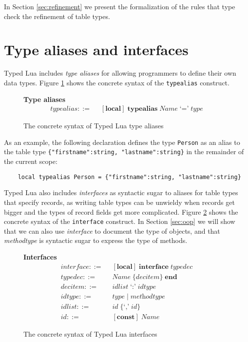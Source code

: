 In Section \ref{sec:refinement} we present the formalization of the
rules that type check the refinement of table types.

\section{Type aliases and interfaces}
\label{sec:alias}

Typed Lua includes \emph{type aliases} for allowing programmers to
define their own data types.
Figure \ref{fig:aliases} shows the concrete syntax of the
\texttt{typealias} construct.

\begin{figure}[!ht]
\textbf{Type aliases}\\
\dstart
\begin{align*}
\textit{typealias} ::= & \;\; [\textbf{local}] \; \textbf{typealias} \; \textit{Name} \; \texttt{`='} \; \textit{type}
\end{align*}
\dend
\caption{The concrete syntax of Typed Lua type aliases}
\label{fig:aliases}
\end{figure}

As an example, the following declaration defines the type \texttt{Person}
as an alias to the table type \texttt{\{"firstname":string, "lastname":string\}}
in the remainder of the current scope:
\begin{verbatim}
    local typealias Person = {"firstname":string, "lastname":string}
\end{verbatim}

Typed Lua also includes \emph{interfaces} as syntactic sugar to aliases
for table types that specify records, as writing table types can be unwieldy
when records get bigger and the types of record fields get more complicated.
Figure \ref{fig:interfaces} shows the concrete syntax of the
\texttt{interface} construct.
In Section \ref{sec:oop} we will show that we can also use \emph{interface} to
document the type of objects, and that \emph{methodtype} is syntactic
sugar to express the type of methods.

\begin{figure}[!ht]
\textbf{Interfaces}\\
\dstart
\begin{align*}
\textit{interface} ::= & \;\; [\textbf{local}] \; \textbf{interface} \; \textit{typedec}\\
\textit{typedec} ::= & \;\; \textit{Name} \; \{\textit{decitem}\} \; \textbf{end}\\
\textit{decitem} ::= & \;\; \textit{idlist} \; \texttt{`:'} \; \textit{idtype}\\
\textit{idtype} ::= & \;\; \textit{type} \; | \; \textit{methodtype}\\
\textit{idlist} ::= & \;\; \textit{id} \; \{\texttt{`,'} \; \textit{id}\}\\
\textit{id} ::= & \;\; [\textbf{const}] \; \textit{Name}
\end{align*}
\dend
\caption{The concrete syntax of Typed Lua interfaces}
\label{fig:interfaces}
\end{figure}

